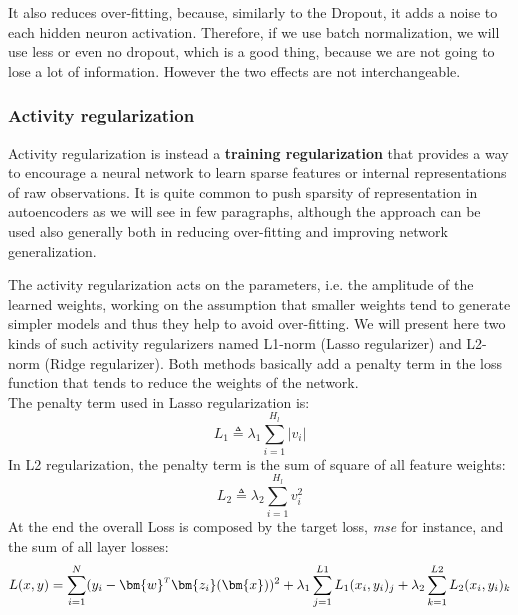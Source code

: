 It also reduces over-fitting, because, similarly to the Dropout, it adds a noise to each hidden neuron activation. Therefore, if we use batch normalization, we will use less or even no dropout, which is a good thing, because we are not going to lose a lot of information. However the two effects are not interchangeable.
%

\subsubsection{Activity regularization}
Activity regularization is instead a \textbf{training regularization} that provides a way to encourage a neural network to learn sparse features or internal representations of raw observations.
It is quite common to push sparsity of representation in autoencoders as we will see in few paragraphs, although the approach can be used also generally both in reducing over-fitting and improving network generalization.

The activity regularization acts on the parameters, i.e. the amplitude of the learned weights, working on the assumption that smaller weights tend to generate simpler models and thus they help to avoid over-fitting. We will present here two kinds of such activity regularizers named L1-norm (Lasso regularizer) and L2-norm (Ridge regularizer). Both methods basically add a penalty term in the loss function that tends to reduce the weights of the network. \\
The penalty term used in Lasso regularization is:
\begin{equation}
    L_1 \triangleq \lambda_1 \sum_{i=1}^{H_l} \left| v_i \right|
\end{equation}
In L2 regularization, the penalty term is the sum of square of all feature weights:
\begin{equation}
    L_2 \triangleq \lambda_2 \sum_{i=1}^{H_l} v_i^2
\end{equation}
At the end the overall Loss is composed by the target loss, \textit{mse} for instance, and the sum of all layer losses:
\begin{equation}
    L(x,y) = \sum_{i=1}^N (y_i - \transpose{\bm{w}}\bm{z_i}(\bm{x}))^2 + \lambda_1 \sum_{j=1}^{L1} L_1(x_i,y_i)_j + \lambda_2 \sum_{k=1}^{L2} L_2(x_i,y_i)_k
\end{equation}

